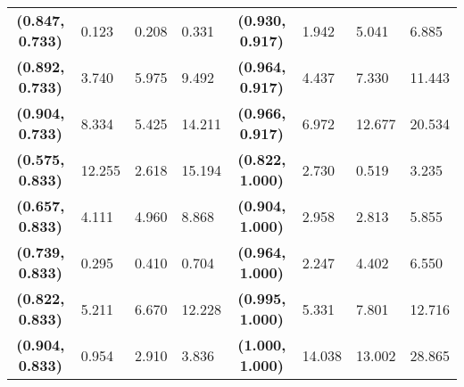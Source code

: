 \begin{table}[H]
{\begin{tabular}{@{}clllc|lll@{}}
\textbf{(0.847, 0.733)}   & 0.123                 & 0.208                   & 0.331                   & \textbf{(0.930, 0.917)}   & 1.942                 & 5.041                   & 6.885                   \\
\textbf{(0.892, 0.733)}   & 3.740                 & 5.975                   & 9.492                   & \textbf{(0.964, 0.917)}   & 4.437                 & 7.330                   & 11.443                  \\
\textbf{(0.904, 0.733)}   & 8.334                 & 5.425                   & 14.211                  & \textbf{(0.966, 0.917)}   & 6.972                 & 12.677                  & 20.534                  \\
\textbf{(0.575, 0.833)}   & 12.255                & 2.618                   & 15.194                  & \textbf{(0.822, 1.000)}   & 2.730                 & 0.519                   & 3.235                   \\
\textbf{(0.657, 0.833)}   & 4.111                 & 4.960                   & 8.868                   & \textbf{(0.904, 1.000)}   & 2.958                 & 2.813                   & 5.855                   \\
\textbf{(0.739, 0.833)}   & 0.295                 & 0.410                   & 0.704                   & \textbf{(0.964, 1.000)}   & 2.247                 & 4.402                   & 6.550                   \\
\textbf{(0.822, 0.833)}   & 5.211                 & 6.670                   & 12.228                  & \textbf{(0.995, 1.000)}   & 5.331                 & 7.801                   & 12.716                  \\
\textbf{(0.904, 0.833)}   & 0.954                 & 2.910                   & 3.836                   & \textbf{(1.000, 1.000)}   & 14.038                & 13.002                  & 28.865                  \\ \bottomrule
\end{tabular}%
}
\end{table}
